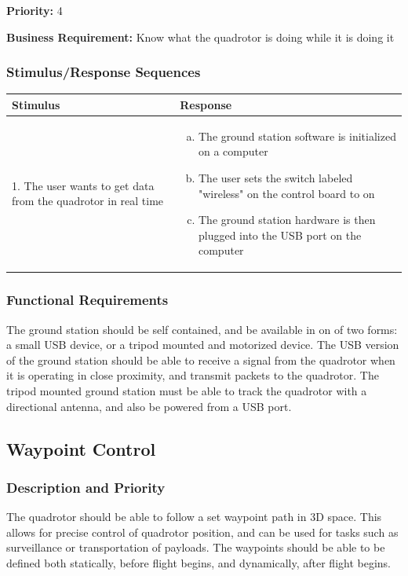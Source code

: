 \documentclass[english]{article}
\numberwithin{equation}{section} %
\begin{document}
\textbf{Priority:} 4

\textbf{Business Requirement:} Know what the quadrotor is doing while it is doing it

\subsubsection{Stimulus/Response Sequences}

\begin{longtable}{p{3cm} | p{8.5cm}}
\hline
\textbf{Stimulus} & \textbf{Response}\\
\hline
1. The user wants to get data from the quadrotor in real time &
\begin{enumerate}[(a)]\itemsep1pt %
\item The ground station software is initialized on a computer
\item The user sets the switch labeled "wireless" on the control board to on
\item The ground station hardware is then plugged into the USB port on the computer
\end{enumerate}
\\ 
\hline
\end{longtable}
\subsubsection{Functional Requirements}
The ground station should be self contained, and be available in on of two forms: a small USB device, or a tripod mounted and motorized device. The USB version of the ground station should be able to receive a signal from the quadrotor when it is operating in close proximity, and transmit packets to the quadrotor. The tripod mounted ground station must be able to track the quadrotor with a directional antenna, and also be powered from a USB port.

\bigskip
\subsection{Waypoint Control}
\subsubsection{Description and Priority}
The quadrotor should be able to follow a set waypoint path in 3D space. This allows for precise control of quadrotor position, and can be used for tasks such as surveillance or transportation of payloads. The waypoints should be able to be defined both statically, before flight begins, and dynamically, after flight begins.
\end{document}
